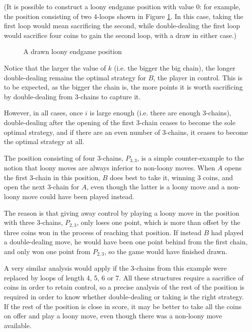 \documentclass[a4paper,twocolumn]{article}
\begin{document}
(It is possible to construct a loony endgame position with value 0:
for example, the position consisting of two 4-loops shown in Figure
\ref{drawnloony}. In this case, taking the first loop would mean
sacrificing the second, while double-dealing the first loop would
sacrifice four coins to gain the second loop, with a draw in either
case.)

\begin{figure}
  \centering
  \def\svgscale{0.7}
  
  \caption{A drawn loony endgame position}
  \label{drawnloony}
\end{figure}

Notice that the larger the value of $k$ (i.e. the bigger the big
chain), the longer double-dealing remains the optimal strategy for
$B$, the player in control. This is to be expected, as the bigger the
chain is, the more points it is worth sacrificing by double-dealing
from 3-chains to capture it.

However, in all cases, once $i$ is large enough (i.e. there are enough
3-chains), double-dealing after the opening of the first 3-chain
ceases to become the sole optimal strategy, and if there are an even
number of 3-chains, it ceases to become the optimal strategy at all.

The position consisting of four 3-chains, $P_{3,3}$, is a simple
counter-example to the notion that loony moves are always inferior to
non-loony moves. When $A$ opens the first 3-chain in this position,
$B$ does best to take it, winning 3 coins, and open the next 3-chain
for $A$, even though the latter is a loony move and a non-loony move
could have been played instead.

The reason is that giving away control by playing a loony move in the
position with three 3-chains, $P_{2,3}$, only loses one point, which
is more than offset by the three coins won in the process of reaching
that position. If instead $B$ had played a double-dealing move, he
would have been one point behind from the first chain, and only won
one point from $P_{2,3}$, so the game would have finished drawn.

A very similar analysis would apply if the 3-chains from this example
were replaced by loops of length 4, 5, 6 or 7. All these structures
require a sacrifice of coins in order to retain control, so a precise
analysis of the rest of the position is required in order to know
whether double-dealing or taking is the right strategy. If the rest of
the position is close in score, it may be better to take all the coins
on offer and play a loony move, even though there was a non-loony move
available.
\end{document}
